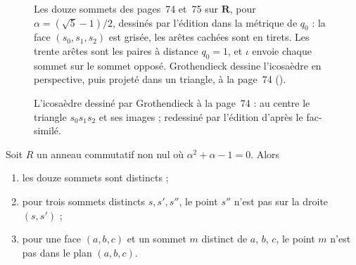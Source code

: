 \begin{figure}[htbp]
\caption{Les douze sommets des pages~74 et~75 sur $\mathbf R$, pour $\alpha = (\sqrt 5 - 1)/2$, dessinés par l'édition dans la métrique de $q_0$ : la face $(s_0, s_1, s_2)$ est grisée, les arêtes cachées sont en tirets. Les trente arêtes sont les paires à distance $q_0 = 1$, et $\iota$ envoie chaque sommet sur le sommet opposé. Grothendieck dessine l'icosaèdre en perspective, puis projeté dans un triangle, à la page~74 ().}
\label{fig:70-icosaedre}
\end{figure}

\begin{figure}[htbp]
\centering
\resizebox{0.6\linewidth}{!}{}
\caption{L'icosaèdre dessiné par Grothendieck à la page~74 : au centre le triangle $s_0 s_1 s_2$ et ses images ; redessiné par l'édition d'après le fac-similé.}\label{fig:70-dessin}
\end{figure}

\begin{enonce}
Soit $R$ un anneau commutatif non nul où $\alpha^2 + \alpha - 1 = 0$. Alors
\begin{enumerate}
\item les douze sommets sont distincts ;
\item pour trois sommets distincts $s, s', s''$, le point $s''$ n'est pas sur la droite $(s, s')$ ;
\item pour une face $(a, b, c)$ et un sommet $m$ distinct de $a$, $b$, $c$, le point $m$ n'est pas dans le plan $(a, b, c)$.
\end{enumerate}
\end{enonce}

